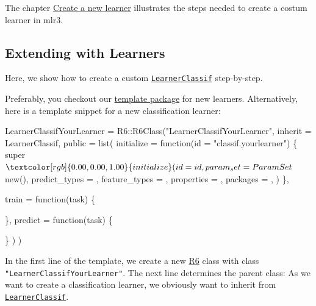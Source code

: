 \documentclass[]{article}
\newenvironment{Shaded}{}{}
\newcommand{\ControlFlowTok}[1]{\textcolor[rgb]{0.00,0.00,1.00}{#1}}
\newcommand{\DataTypeTok}[1]{#1}
\newcommand{\KeywordTok}[1]{\textcolor[rgb]{0.00,0.00,1.00}{#1}}
\newcommand{\NormalTok}[1]{#1}
\newcommand{\OperatorTok}[1]{#1}
\newcommand{\StringTok}[1]{\textcolor[rgb]{0.00,0.50,0.50}{#1}}
\renewenvironment{Shaded} {\begin{snugshade}\small} {\end{snugshade}}
\begin{document}
The chapter \protect\hyperlink{ext-learner}{Create a new learner} illustrates the steps needed to create a costum learner in mlr3.

\hypertarget{ext-learner}{%
\subsection{Extending with Learners}\label{ext-learner}}

Here, we show how to create a custom \href{https://mlr3.mlr-org.com/reference/LearnerClassif.html}{\texttt{LearnerClassif}} step-by-step.

Preferably, you checkout our \href{https://github.com/mlr-org/mlr3learnertemplate}{template package} for new learners.
Alternatively, here is a template snippet for a new classification learner:

\begin{Shaded}
\begin{Highlighting}[]
\NormalTok{LearnerClassifYourLearner =}\StringTok{ }\NormalTok{R6}\OperatorTok{::}\KeywordTok{R6Class}\NormalTok{(}\StringTok{"LearnerClassifYourLearner"}\NormalTok{,}
  \DataTypeTok{inherit =}\NormalTok{ LearnerClassif,}
  \DataTypeTok{public =} \KeywordTok{list}\NormalTok{(}
    \DataTypeTok{initialize =} \ControlFlowTok{function}\NormalTok{(}\DataTypeTok{id =} \StringTok{"classif.yourlearner"}\NormalTok{) \{}
\NormalTok{      super}\OperatorTok{$}\KeywordTok{initialize}\NormalTok{(}
        \DataTypeTok{id =}\NormalTok{ id,}
        \DataTypeTok{param_set =}\NormalTok{ ParamSet}\OperatorTok{$}\KeywordTok{new}\NormalTok{(),}
        \DataTypeTok{predict_types =}\NormalTok{ ,}
        \DataTypeTok{feature_types =}\NormalTok{ ,}
        \DataTypeTok{properties =}\NormalTok{ ,}
        \DataTypeTok{packages =}\NormalTok{ ,}
\NormalTok{      )}
\NormalTok{    \},}

    \DataTypeTok{train =} \ControlFlowTok{function}\NormalTok{(task) \{}

\NormalTok{    \},}
    \DataTypeTok{predict =} \ControlFlowTok{function}\NormalTok{(task) \{}

\NormalTok{    \}}
\NormalTok{  )}
\NormalTok{)}
\end{Highlighting}
\end{Shaded}

In the first line of the template, we create a new \href{https://cran.r-project.org/package=R6}{R6} class with class \texttt{"LearnerClassifYourLearner"}.
The next line determines the parent class:
As we want to create a classification learner, we obviously want to inherit from \href{https://mlr3.mlr-org.com/reference/LearnerClassif.html}{\texttt{LearnerClassif}}.
\end{document}
